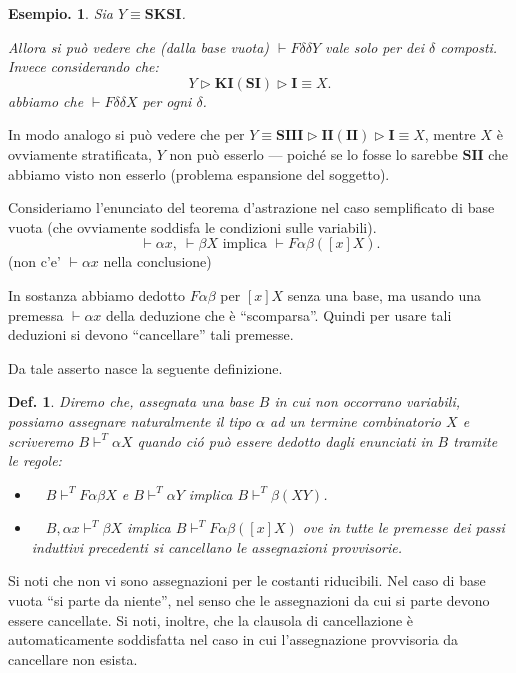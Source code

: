 \documentclass{book}
\newtheorem{definizione}{Def.}[chapter]
\newtheorem{esempio}{Esempio.}
\newcommand*{\ii}{\mathbf{I}}    %
\newcommand*{\kk}{\mathbf{K}}    %
\newcommand*{\sss}{\mathbf{S}}   %
\newcommand*{\asse}{\vdash\!\!           }
\newcommand*{\asset}{\vdash^T\!\!}
\begin{document}
\begin{esempio}
Sia $Y \equiv \sss\kk\sss\ii$. 

Allora si pu\`o vedere che (dalla base vuota)
$\asse F\delta\delta Y$ vale solo per dei $\delta$ composti.
Invece considerando che:
 $$Y \vartriangleright \kk\ii(\sss\ii) \vartriangleright
\ii \equiv X.$$ abbiamo che $\asse F\delta\delta X$ per ogni $\delta$.
\end{esempio}
In modo analogo si pu\`o vedere che per $Y \equiv \sss\ii\ii\ii 
\vartriangleright \ii\ii(\ii\ii) \vartriangleright \ii \equiv X$, mentre $X$ 
\`e ovviamente 
stratificata, $Y$ non pu\`o esserlo --- poich\'e se lo fosse lo sarebbe
$\sss\ii\ii$ che abbiamo visto non esserlo (problema espansione del soggetto).

Consideriamo l'enunciato del teorema d'astrazione nel caso semplificato di base
vuota (che ovviamente soddisfa le condizioni sulle variabili).
\[
\asse \alpha x, \ \asse \beta X \text{ implica } \asse 
F\alpha\beta([x]X).
\]
(non c'e' $\asse \alpha x$ nella conclusione)

In sostanza abbiamo dedotto $F\alpha\beta$ per $[x]X$ senza una base, ma usando
una premessa $\asse\alpha x$ della deduzione che \`e ``scomparsa''. Quindi per
usare tali deduzioni si devono ``cancellare'' tali premesse.

Da tale asserto nasce la seguente definizione.

\begin{definizione}
Diremo che, assegnata una base $B$ in cui non occorrano variabili, possiamo
assegnare \emph{naturalmente} il tipo $\alpha$ ad un termine combinatorio $X$
e scriveremo $B \asset \alpha X$ quando ci\'o pu\`o essere dedotto dagli 
enunciati in $B$ tramite le regole:
\begin{itemize}
\item[$(F)$]$\quad B \asset F\alpha\beta X$ e $B \asset \alpha Y$ implica $B 
  \asset\beta (XY)$.
\item[$(F_i)$]$\quad B, \alpha x \asset \beta X$ implica $B \asset F\alpha\beta
  ([x]X)$ ove in tutte le premesse dei passi induttivi precedenti si cancellano
  le assegnazioni provvisorie.
\end{itemize}
\end{definizione}

Si noti che non vi sono assegnazioni per le costanti riducibili. Nel caso di
base vuota ``si parte da niente'', nel senso che le assegnazioni da cui si
parte devono essere cancellate. Si noti, inoltre, che la clausola di 
cancellazione \`e automaticamente soddisfatta nel caso in cui l'assegnazione
provvisoria da cancellare non esista.
\end{document}
